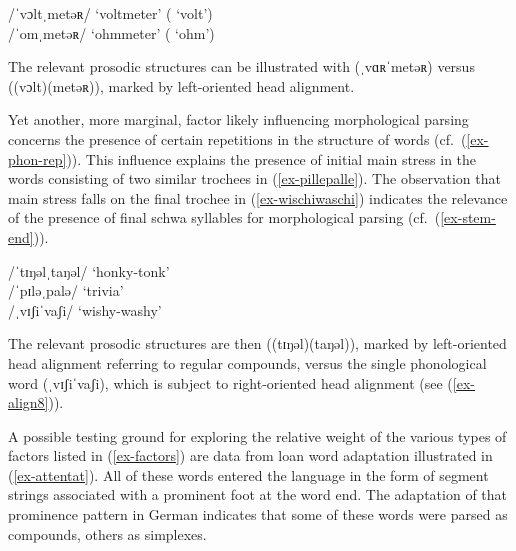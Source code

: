 \documentclass[output=paper
 ,nobabel
 ,draftmode
 ,colorlinks, citecolor=brown
]{langscibook}
\begin{document}
\ex\label{ex-voltmeter}
/ˈvɔltˌmetəʀ/  `voltmeter' ( `volt')  \\ 
/ˈomˌmetəʀ/  `ohmmeter' ( `ohm')  \\ 

\zl

\noindent
The relevant prosodic structures can be illustrated with (ˌvɑʀˈmetəʀ) versus ((vɔlt)(metəʀ)), marked by left-oriented head alignment.

Yet another, more marginal, factor likely influencing morphological parsing concerns the presence of certain repetitions in the structure of words (cf.\ (\ref{ex-phon-rep})). This influence explains the presence of initial main stress in the words consisting of two similar trochees in (\ref{ex-pillepalle}). The observation that main stress falls on the final trochee in (\ref{ex-wischiwaschi}) indicates the relevance of the presence of final schwa syllables for morphological parsing (cf.\ (\ref{ex-stem-end})).


\eal\label{ex-Pille-Waschi}
\ex\label{ex-pillepalle}
/ˈtɪŋəlˌtaŋəl/  `honky-tonk'  \\ 
/ˈpɪləˌpalə/  `trivia'  \\ 

\ex\label{ex-wischiwaschi}
/ˌvɪʃiˈvaʃi/  `wishy-washy'   \\ 

\zl

\noindent
The relevant prosodic structures are then ((tɪŋəl)(taŋəl)), marked by left-oriented head alignment referring to regular compounds, versus the single phonological word (ˌvɪʃiˈvaʃi), which is subject to right-oriented head alignment (see (\ref{ex-align8})).

\largerpage
A possible testing ground for exploring the relative weight of the various types of factors listed
in (\ref{ex-factors}) are data from loan word adaptation illustrated in (\ref{ex-attentat}). All of
these words entered the language in the form of segment strings associated with a prominent foot at
the word end. The adaptation of that prominence pattern in German indicates that some of these words
were parsed as compounds, others as simplexes. 


\ea\label{ex-attentat}
\end{document}

